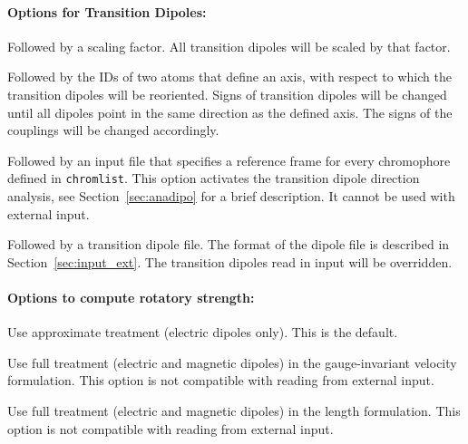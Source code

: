 \documentclass[a4paper,11pt]{article}
\begin{document}
\paragraph*{Options for Transition Dipoles:}
\begin{description}[labelsep=10pt, align=left, labelwidth=80pt,labelindent=0pt,leftmargin=90pt]
\item[\texttt{-{}-scaledipo}] Followed by a scaling factor. All transition dipoles will be scaled by that factor.  
\item[\texttt{-{}-reorient}] Followed by the IDs of two atoms that define an axis, with respect to which the transition dipoles will be reoriented. Signs of transition dipoles will be changed until all dipoles point in the same direction as the defined axis. The signs of the couplings will be changed accordingly.
\item[\texttt{-{}-anadipo}] Followed by an input file that specifies a reference frame for every chromophore defined in \texttt{chromlist}. This option activates the transition dipole direction analysis, see Section~\ref{sec:anadipo} for a brief description. It cannot be used with external input.
\item[\texttt{-{}-indipo}] Followed by a transition dipole file. The format of the dipole file is described in Section~\ref{sec:input_ext}. The transition dipoles read in input will be overridden.
\end{description}

\paragraph*{Options to compute rotatory strength:}
\begin{description}[labelsep=10pt, align=left, labelwidth=80pt,labelindent=0pt,leftmargin=90pt]
\item[\texttt{-{}-mu}]  Use approximate treatment (electric dipoles only). This is the default.
\item[\texttt{-{}-mag}] Use full treatment (electric and magnetic dipoles) in the gauge-invariant velocity formulation. This option is not compatible with reading from external input.
\item[\texttt{-{}-length}] Use full treatment (electric and magnetic dipoles) in the length formulation. This option is not compatible with reading from external input. 
\end{description}
\end{document}
